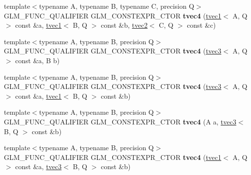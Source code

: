 \begin{DoxyCompactItemize}
\item 
\mbox{\label{structglm_1_1tvec4_a934d3eae7a5d0a856dfa489a05ed0add}} 
{\footnotesize template$<$typename A, typename B, typename C, precision Q$>$ }\\G\+L\+M\+\_\+\+F\+U\+N\+C\+\_\+\+Q\+U\+A\+L\+I\+F\+I\+ER G\+L\+M\+\_\+\+C\+O\+N\+S\+T\+E\+X\+P\+R\+\_\+\+C\+T\+OR {\bfseries tvec4} (\hyperlink{structglm_1_1tvec1}{tvec1}$<$ A, Q $>$ const \&a, \hyperlink{structglm_1_1tvec1}{tvec1}$<$ B, Q $>$ const \&b, \hyperlink{structglm_1_1tvec2}{tvec2}$<$ C, Q $>$ const \&c)
\item 
\mbox{\label{structglm_1_1tvec4_a001bfb02e9fa17b80e0623427fa0930a}} 
{\footnotesize template$<$typename A, typename B, precision Q$>$ }\\G\+L\+M\+\_\+\+F\+U\+N\+C\+\_\+\+Q\+U\+A\+L\+I\+F\+I\+ER G\+L\+M\+\_\+\+C\+O\+N\+S\+T\+E\+X\+P\+R\+\_\+\+C\+T\+OR {\bfseries tvec4} (\hyperlink{structglm_1_1tvec3}{tvec3}$<$ A, Q $>$ const \&a, B b)
\item 
\mbox{\label{structglm_1_1tvec4_a506f198067118e4a9f162df80f60f3f5}} 
{\footnotesize template$<$typename A, typename B, precision Q$>$ }\\G\+L\+M\+\_\+\+F\+U\+N\+C\+\_\+\+Q\+U\+A\+L\+I\+F\+I\+ER G\+L\+M\+\_\+\+C\+O\+N\+S\+T\+E\+X\+P\+R\+\_\+\+C\+T\+OR {\bfseries tvec4} (\hyperlink{structglm_1_1tvec3}{tvec3}$<$ A, Q $>$ const \&a, \hyperlink{structglm_1_1tvec1}{tvec1}$<$ B, Q $>$ const \&b)
\item 
\mbox{\label{structglm_1_1tvec4_a2f15e73af5478c2f022181af8ad77a0a}} 
{\footnotesize template$<$typename A, typename B, precision Q$>$ }\\G\+L\+M\+\_\+\+F\+U\+N\+C\+\_\+\+Q\+U\+A\+L\+I\+F\+I\+ER G\+L\+M\+\_\+\+C\+O\+N\+S\+T\+E\+X\+P\+R\+\_\+\+C\+T\+OR {\bfseries tvec4} (A a, \hyperlink{structglm_1_1tvec3}{tvec3}$<$ B, Q $>$ const \&b)
\item 
\mbox{\label{structglm_1_1tvec4_aebea9cbe53b55ac6ed167355f13c22ad}} 
{\footnotesize template$<$typename A, typename B, precision Q$>$ }\\G\+L\+M\+\_\+\+F\+U\+N\+C\+\_\+\+Q\+U\+A\+L\+I\+F\+I\+ER G\+L\+M\+\_\+\+C\+O\+N\+S\+T\+E\+X\+P\+R\+\_\+\+C\+T\+OR {\bfseries tvec4} (\hyperlink{structglm_1_1tvec1}{tvec1}$<$ A, Q $>$ const \&a, \hyperlink{structglm_1_1tvec3}{tvec3}$<$ B, Q $>$ const \&b)

\end{DoxyCompactItemize}
